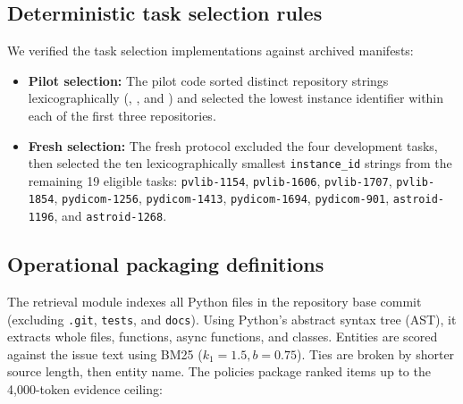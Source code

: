 \documentclass[11pt]{article}
\begin{document}
\subsection{Deterministic task selection rules}

{\sloppy
We verified the task selection implementations against archived manifests:
\begin{itemize}[nosep]
  \item \textbf{Pilot selection:} The pilot code sorted distinct repository
    strings lexicographically (,
    , and ) and selected the
    lowest instance identifier within each of the first three repositories.
  \item \textbf{Fresh selection:} The fresh protocol excluded the four
    development tasks, then selected the ten lexicographically smallest
    \texttt{instance\_id} strings from the remaining 19 eligible tasks:
    \texttt{pvlib-1154}, \texttt{pvlib-1606}, \texttt{pvlib-1707},
    \texttt{pvlib-1854}, \texttt{pydicom-1256}, \texttt{pydicom-1413},
    \texttt{pydicom-1694}, \texttt{pydicom-901}, \texttt{astroid-1196},
    and \texttt{astroid-1268}.
\end{itemize}
\par}

\subsection{Operational packaging definitions}

The retrieval module indexes all Python files in the repository base commit
(excluding \texttt{.git}, \texttt{tests}, and \texttt{docs}).  Using
Python's abstract syntax tree (AST), it extracts whole files, functions,
async functions, and classes.  Entities are scored against the issue text
using BM25 ($k_1=1.5, b=0.75$).  Ties are broken by shorter source length,
then entity name.  The policies package ranked items up to the 4{,}000-token
evidence ceiling:
\end{document}
